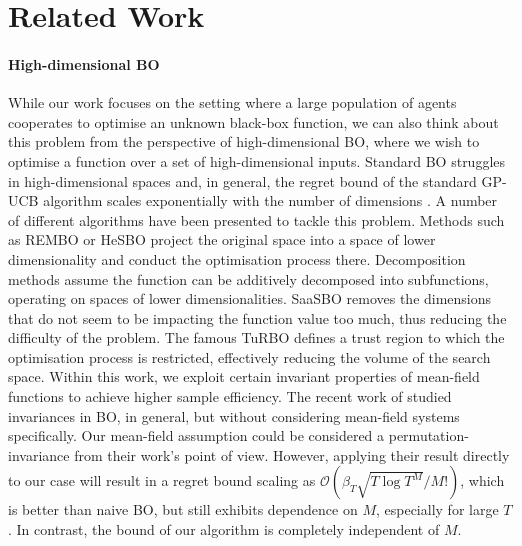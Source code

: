 \section{Related Work}
\paragraph{High-dimensional BO}
While our work focuses on the setting where a large population of agents cooperates to optimise an unknown black-box function, we can also think about this problem from the perspective of high-dimensional BO, where we wish to optimise a function over a set of high-dimensional inputs. Standard BO struggles in high-dimensional spaces and, in general, the regret bound of the standard GP-UCB algorithm scales exponentially with the number of dimensions \cite{srinivas2009gaussian, chowdhury2017kernelized}. A number of different algorithms have been presented to tackle this problem. Methods such as REMBO \cite{wang2016bayesian} or HeSBO \cite{nayebi2019framework} project the original space into a space of lower dimensionality and conduct the optimisation process there. Decomposition methods \cite{rolland2018high, han2021high, ziomek2023random} assume the function can be additively decomposed into subfunctions, operating on spaces of lower dimensionalities. SaaSBO \cite{eriksson2021high} removes the dimensions that do not seem to be impacting the function value too much, thus reducing the difficulty of the problem. The famous TuRBO \cite{eriksson2019scalable} defines a trust region to which the optimisation process is restricted, effectively reducing the volume of the search space. Within this work, we exploit certain invariant properties of mean-field functions to achieve higher sample efficiency. The recent work of \citet{brown2024sample} studied invariances in BO, in general, but without considering mean-field systems specifically. Our mean-field assumption could be considered a permutation-invariance from their work's point of view. However, applying their result directly to our case will result in a regret bound scaling as $\mathcal{O}(\beta_T\sqrt{T\log T^M} / M!)$, which is better than naive BO, but still exhibits dependence on $M$, especially for large $T$. In contrast, the bound of our algorithm is completely independent of $M$. 

